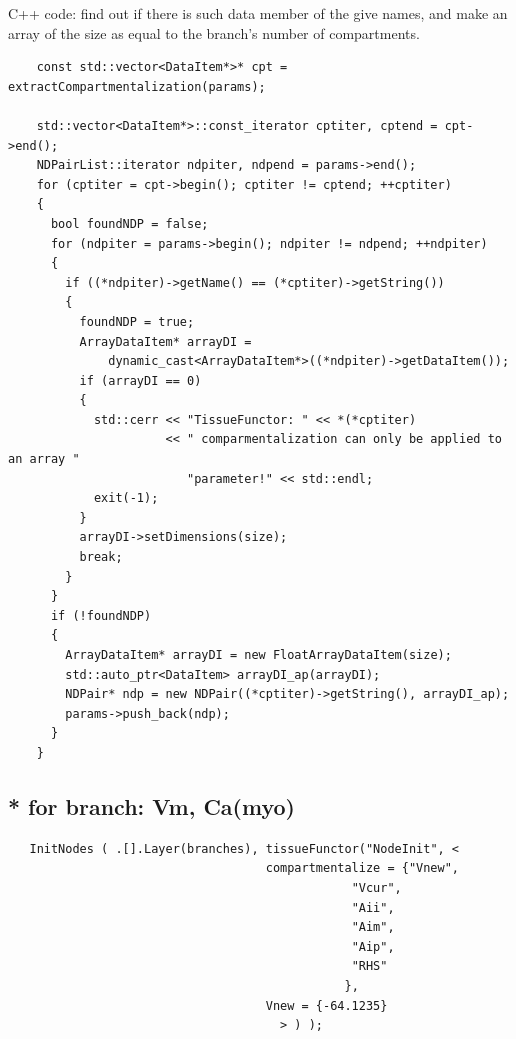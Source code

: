 C++ code: find out if there is such data member of the give names, and make an
array of the size as equal to the branch's number of compartments.
\begin{verbatim}
    const std::vector<DataItem*>* cpt = extractCompartmentalization(params);

    std::vector<DataItem*>::const_iterator cptiter, cptend = cpt->end();
    NDPairList::iterator ndpiter, ndpend = params->end();
    for (cptiter = cpt->begin(); cptiter != cptend; ++cptiter)
    {
      bool foundNDP = false;
      for (ndpiter = params->begin(); ndpiter != ndpend; ++ndpiter)
      {
        if ((*ndpiter)->getName() == (*cptiter)->getString())
        {
          foundNDP = true;
          ArrayDataItem* arrayDI =
              dynamic_cast<ArrayDataItem*>((*ndpiter)->getDataItem());
          if (arrayDI == 0)
          {
            std::cerr << "TissueFunctor: " << *(*cptiter)
                      << " comparmentalization can only be applied to an array "
                         "parameter!" << std::endl;
            exit(-1);
          }
          arrayDI->setDimensions(size);
          break;
        }
      }
      if (!foundNDP)
      {
        ArrayDataItem* arrayDI = new FloatArrayDataItem(size);
        std::auto_ptr<DataItem> arrayDI_ap(arrayDI);
        NDPair* ndp = new NDPair((*cptiter)->getString(), arrayDI_ap);
        params->push_back(ndp);
      }
    }

\end{verbatim}

\subsection{* for branch: Vm, Ca(myo)}

{\tiny
\begin{verbatim}
   InitNodes ( .[].Layer(branches), tissueFunctor("NodeInit", <
									compartmentalize = {"Vnew", 
											    "Vcur", 
											    "Aii", 
											    "Aim", 
											    "Aip", 
											    "RHS"
											   },
									Vnew = {-64.1235}
								      > ) );
\end{verbatim}
}

